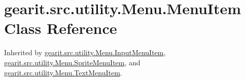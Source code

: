 \hypertarget{classgearit_1_1src_1_1utility_1_1_menu_1_1_menu_item}{\section{gearit.\+src.\+utility.\+Menu.\+Menu\+Item Class Reference}
\label{classgearit_1_1src_1_1utility_1_1_menu_1_1_menu_item}
}


Inherited by \hyperlink{classgearit_1_1src_1_1utility_1_1_menu_1_1_input_menu_item}{gearit.\+src.\+utility.\+Menu.\+Input\+Menu\+Item}, \hyperlink{classgearit_1_1src_1_1utility_1_1_menu_1_1_sprite_menu_item}{gearit.\+src.\+utility.\+Menu.\+Sprite\+Menu\+Item}, and \hyperlink{classgearit_1_1src_1_1utility_1_1_menu_1_1_text_menu_item}{gearit.\+src.\+utility.\+Menu.\+Text\+Menu\+Item}.

